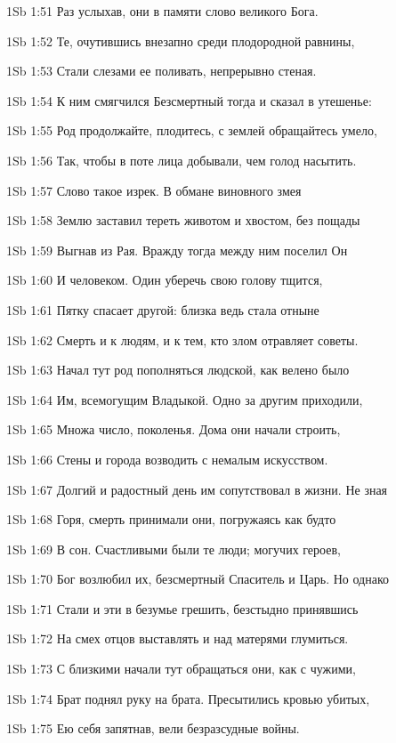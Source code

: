 \vs 1Sb 1:51 Раз услыхав, они в памяти слово великого Бога.

\vs 1Sb 1:52 Те, очутившись внезапно среди плодородной равнины,

\vs 1Sb 1:53 Стали слезами ее поливать, непрерывно стеная.

\vs 1Sb 1:54 К ним смягчился Безсмертный тогда и сказал в утешенье:

\vs 1Sb 1:55 Род продолжайте, плодитесь, с землей обращайтесь умело,

\vs 1Sb 1:56 Так, чтобы в поте лица добывали, чем голод насытить.

\vs 1Sb 1:57 Слово такое изрек. В обмане виновного змея

\vs 1Sb 1:58 Землю заставил тереть животом и хвостом, без пощады

\vs 1Sb 1:59 Выгнав из Рая. Вражду тогда между ним поселил Он

\vs 1Sb 1:60 И человеком. Один уберечь свою голову тщится,

\vs 1Sb 1:61 Пятку спасает другой: близка ведь стала отныне

\vs 1Sb 1:62 Смерть и к людям, и к тем, кто злом отравляет советы.

\vs 1Sb 1:63 Начал тут род пополняться людской, как велено было

\vs 1Sb 1:64 Им, всемогущим Владыкой. Одно за другим приходили,

\vs 1Sb 1:65 Множа число, поколенья. Дома они начали строить,

\vs 1Sb 1:66 Стены и города возводить с немалым искусством.

\vs 1Sb 1:67 Долгий и радостный день им сопутствовал в жизни. Не зная

\vs 1Sb 1:68 Горя, смерть принимали они, погружаясь как будто

\vs 1Sb 1:69 В сон. Счастливыми были те люди; могучих героев,

\vs 1Sb 1:70 Бог возлюбил их, безсмертный Спаситель и Царь. Но однако

\vs 1Sb 1:71 Стали и эти в безумье грешить, безстыдно принявшись

\vs 1Sb 1:72 На смех отцов выставлять и над матерями глумиться.

\vs 1Sb 1:73 С близкими начали тут обращаться они, как с чужими,

\vs 1Sb 1:74 Брат поднял руку на брата. Пресытились кровью убитых,

\vs 1Sb 1:75 Ею себя запятнав, вели безразсудные войны.

